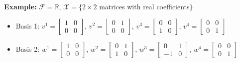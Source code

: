 \documentclass[letterpaper]{article}
\begin{document}
    \newpage

\noindent \textbf{Example:} $\mathcal{F}=\mathbb{R}$, $\mathcal{X}=\{2\times2$ matrices with real coefficients$\}$
    \begin{itemize}
        \item[] Basis 1: $v^{1}=\left[\begin{array}{cc}
            1 & 0\\
            0 & 0
            \end{array}\right]$, $v^{2}=\left[\begin{array}{cc}
            0 & 1\\
            0 & 0
            \end{array}\right]$, $v^{3}=\left[\begin{array}{cc}
            0 & 0\\
            1 & 0
            \end{array}\right]$, $v^{4}=\left[\begin{array}{cc}
            0 & 0\\
            0 & 1
            \end{array}\right]$
        \item[] Basis 2: $w^{1}=\left[\begin{array}{cc}
            1 & 0\\
            0 & 0
            \end{array}\right]$, $w^{2}=\left[\begin{array}{cc}
            0 & 1\\
            1 & 0
            \end{array}\right]$, $w^{3}=\left[\begin{array}{cc}
            0 & 1\\
            -1 & 0
            \end{array}\right]$, $w^{4}=\left[\begin{array}{cc}
            0 & 0\\
            0 & 1
            \end{array}\right]$
    \end{itemize}
\end{document}
